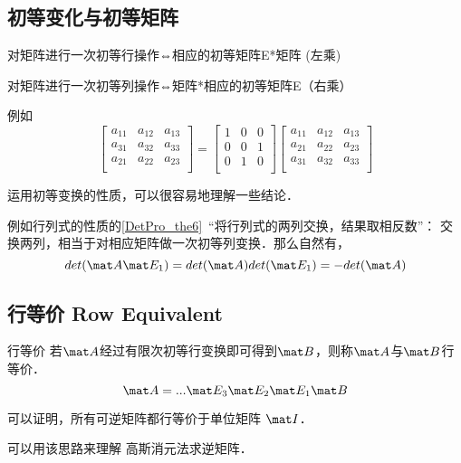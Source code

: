 \subsection{初等变化与初等矩阵}
\begin{theorem}{}
对矩阵进行一次初等行操作⇔相应的初等矩阵E*矩阵 (左乘)

对矩阵进行一次初等列操作⇔矩阵*相应的初等矩阵E（右乘）
\end{theorem}

\begin{example}{}
例如
\begin{equation}
\begin{bmatrix}
    a_{11} & a_{12} & a_{13}\\
    a_{31} & a_{32} & a_{33}\\
    a_{21} & a_{22} & a_{23}\\
\end{bmatrix}
=
    \begin{bmatrix}
        1 & 0 & 0\\
        0 & 0 & 1\\
        0 & 1 & 0\\
    \end{bmatrix}
\begin{bmatrix}
        a_{11} & a_{12} & a_{13}\\
        a_{21} & a_{22} & a_{23}\\
        a_{31} & a_{32} & a_{33}\\
\end{bmatrix}
\end{equation}
\end{example}

运用初等变换的性质，可以很容易地理解一些结论．

\begin{example}{}
例如行列式的性质的\autoref{DetPro_the6}~“将行列式的两列交换，结果取相反数”： 交换两列，相当于对相应矩阵做一次初等列变换．那么自然有，
$$det (\mat A \mat E_1)=det (\mat A) det(\mat E_1)=-det (\mat A)$$
\end{example}

\subsection{行等价 Row Equivalent}
\begin{definition}{行等价}
若$\mat A$经过有限次初等行变换即可得到$\mat B$，则称$\mat A$与$\mat B$行等价．
\begin{equation}
\mat A= ... \mat E_3 \mat E_2 \mat E_1 \mat  B
\end{equation}
\end{definition}

可以证明，所有可逆矩阵都行等价于单位矩阵 $\mat I$．

可以用该思路来理解 高斯消元法求逆矩阵．
